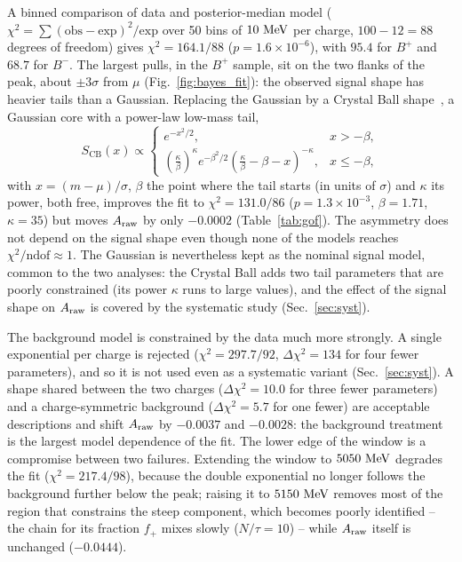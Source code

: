 A binned comparison of data and posterior-median model ($\chi^2=\sum(\text{obs}-\text{exp})^2/\text{exp}$ over 50 bins of $10\,\,\text{Me\hspace{-.08em}V}$ per charge, $100-12=88$ degrees of freedom) gives $\chi^2=164.1/88$ ($p=1.6\times10^{-6}$), with $95.4$ for $B^+$ and $68.7$ for $B^-$. The largest pulls, in the $B^+$ sample, sit on the two flanks of the peak, about $\pm3\sigma$ from $\mu$ (Fig.~\ref{fig:bayes_fit}): the observed signal shape has heavier tails than a Gaussian. Replacing the Gaussian by a Crystal Ball shape~\cite{skwarnicki}, a Gaussian core with a power-law low-mass tail,
\begin{equation}
S_{\mathrm{CB}}(x)\propto
\begin{cases}
e^{-x^2/2}, & x>-\beta,\\[2pt]
\left(\frac{\kappa}{\beta}\right)^{\kappa} e^{-\beta^2/2}\left(\frac{\kappa}{\beta}-\beta-x\right)^{-\kappa}, & x\leq-\beta,
\end{cases}
\label{eq:cb}
\end{equation}
with $x=(m-\mu)/\sigma$, $\beta$ the point where the tail starts (in units of $\sigma$) and $\kappa$ its power, both free, improves the fit to $\chi^2=131.0/86$ ($p=1.3\times10^{-3}$, $\beta=1.71$, $\kappa=35$) but moves $A_{\mathrm{raw}}$ by only $-0.0002$ (Table~\ref{tab:gof}). The asymmetry does not depend on the signal shape even though none of the models reaches $\chi^2/\text{ndof}\approx1$. The Gaussian is nevertheless kept as the nominal signal model, common to the two analyses: the Crystal Ball adds two tail parameters that are poorly constrained (its power $\kappa$ runs to large values), and the effect of the signal shape on $A_{\mathrm{raw}}$ is covered by the systematic study (Sec.~\ref{sec:syst}).

The background model is constrained by the data much more strongly. A single exponential per charge is rejected ($\chi^2=297.7/92$, $\Delta\chi^2=134$ for four fewer parameters), and so it is not used even as a systematic variant (Sec.~\ref{sec:syst}). A shape shared between the two charges ($\Delta\chi^2=10.0$ for three fewer parameters) and a charge-symmetric background ($\Delta\chi^2=5.7$ for one fewer) are acceptable descriptions and shift $A_{\mathrm{raw}}$ by $-0.0037$ and $-0.0028$: the background treatment is the largest model dependence of the fit. The lower edge of the window is a compromise between two failures. Extending the window to $5050\,\,\text{Me\hspace{-.08em}V}$ degrades the fit ($\chi^2=217.4/98$), because the double exponential no longer follows the background further below the peak; raising it to $5150\,\,\text{Me\hspace{-.08em}V}$ removes most of the region that constrains the steep component, which becomes poorly identified -- the chain for its fraction $f_+$ mixes slowly ($N/\tau=10$) -- while $A_{\mathrm{raw}}$ itself is unchanged ($-0.0444$).

